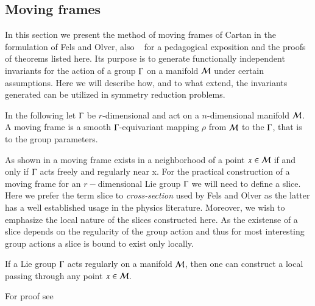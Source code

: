

\subsection{Moving frames}
\label{sec:mf}

In this section we present the method of moving frames of
Cartan in the formulation of Fels and
Olver, also \cf~
for a pedagogical exposition and the proofs of theorems
listed here. Its purpose is to generate functionally
independent invariants for the action of a group $\Gamma$ on
a manifold $\mathcal{M}$ under certain assumptions. Here we will
describe how, and to what extend, the invariants generated can be utilized in
symmetry reduction problems.

In the following let $\Gamma$ be $r$-dimensional and act on a
$n$-dimensional manifold $\mathcal{M}$. A moving frame is a smooth
$\Gamma$-equivariant mapping $\rho$ from $\mathcal{M}$ to the
$\Gamma$, that is to the group parameters. 

As shown in  a moving frame exists
in a neighborhood of a point $x\in\mathcal{M}$ if and only if
$\Gamma$ acts freely and regularly  near x. For the practical
construction of a moving frame for an $r-$dimensional Lie group
$\Gamma$ we will need to define a slice. Here we prefer the term slice
to \emph{cross-section} used by Fels and Olver\rf{FelsOlver98}
as the latter has a well established usage in the physics
literature. Moreover, we wish to emphasize the local nature
of the slices constructed here. As the existense of a slice
depends on the regularity of the group action
and thus for most interesting group actions a slice is bound to
exist only locally.

\begin{proposition}%
 \label{pro:crossExists}
 If a Lie group $\Gamma$ acts regularly on a manifold
 $\mathcal{M}$, then one can construct a
 local {\csection} passing through any point $x\in \mathcal{M}$.
\end{proposition}
For proof see 

